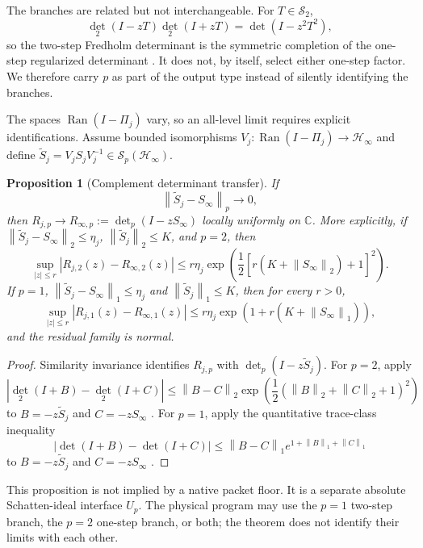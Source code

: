 \documentclass[11pt]{article}
\newtheorem{proposition}[theorem]{Proposition}
\theoremstyle{definition}
\theoremstyle{remark}
\newcommand{\cH}{\mathcal H}
\newcommand{\Ran}{\operatorname{Ran}}
\newcommand{\norm}[1]{\left\lVert#1\right\rVert}
\begin{document}
The branches are related but not interchangeable.  For
$T\in\mathcal S_2$,
\[
 \det_2(I-zT)\det_2(I+zT)=\det(I-z^2T^2),
\]
so the two-step Fredholm determinant is the symmetric completion of the
one-step regularized determinant \citep{WangRH45}.  It does not, by itself,
select either one-step factor.  We therefore carry $p$ as part of the output
type instead of silently identifying the branches.

The spaces $\Ran(I-\Pi_j)$ vary, so an all-level limit requires explicit
identifications.  Assume bounded isomorphisms
$V_j:\Ran(I-\Pi_j)\to\cH_\infty$ and define
$\widetilde S_j=V_jS_jV_j^{-1}\in\mathcal S_p(\cH_\infty)$.

\begin{proposition}[Complement determinant transfer]
\label{prop:det-transfer}
If
\[
 \norm{\widetilde S_j-S_\infty}_p\longrightarrow0,
\]
then $R_{j,p}\to R_{\infty,p}:=\det_p(I-zS_\infty)$ locally uniformly on
$\mathbb C$.  More explicitly, if
$\norm{\widetilde S_j-S_\infty}_2\leq\eta_j$,
$\norm{\widetilde S_j}_2\leq K$, and $p=2$, then
\begin{equation}\label{eq:det2-bound}
 \sup_{|z|\leq r}|R_{j,2}(z)-R_{\infty,2}(z)|
 \leq r\eta_j
 \exp\!\left(\frac12\left[r(K+\norm{S_\infty}_2)+1\right]^2\right).
\end{equation}
If $p=1$,
$\norm{\widetilde S_j-S_\infty}_1\leq\eta_j$ and
$\norm{\widetilde S_j}_1\leq K$, then for every $r>0$,
\begin{equation}\label{eq:det-bound}
 \sup_{|z|\leq r}|R_{j,1}(z)-R_{\infty,1}(z)|
 \leq r\eta_j
 \exp\!\left(1+r(K+\norm{S_\infty}_1)\right),
\end{equation}
and the residual family is normal.
\end{proposition}
\begin{proof}
Similarity invariance identifies $R_{j,p}$ with
$\det_p(I-z\widetilde S_j)$.  For $p=2$, apply
\[
 |\det_2(I+B)-\det_2(I+C)|
 \leq\norm{B-C}_2
 \exp\!\left(\frac12(\norm B_2+\norm C_2+1)^2\right)
\]
to $B=-z\widetilde S_j$ and $C=-zS_\infty$ \citep{Simon2005}.  For $p=1$,
apply the quantitative trace-class inequality
\[
 |\det(I+B)-\det(I+C)|
 \leq\norm{B-C}_1e^{1+\norm B_1+\norm C_1}
\]
to $B=-z\widetilde S_j$ and $C=-zS_\infty$ \citep{Simon2005}.
\end{proof}

This proposition is not implied by a native packet floor.  It is a separate
absolute Schatten-ideal interface $U_p$.  The physical program may use the
$p=1$ two-step branch, the $p=2$ one-step branch, or both; the theorem does
not identify their limits with each other.
\end{document}
